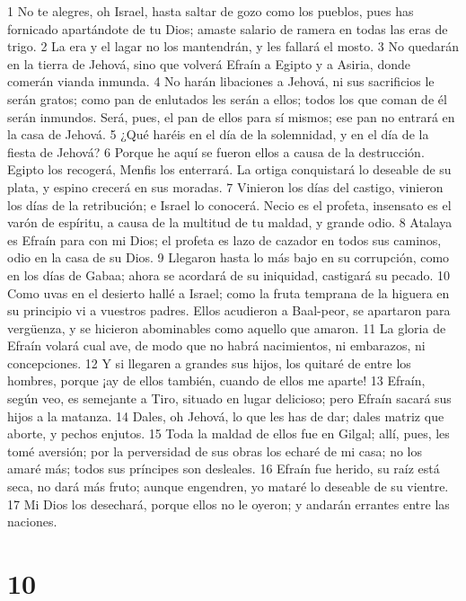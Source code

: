 1 No te alegres, oh Israel, hasta saltar de gozo como los pueblos, pues has fornicado apartándote de tu Dios; amaste salario de ramera en todas las eras de trigo.
2 La era y el lagar no los mantendrán, y les fallará el mosto.
3 No quedarán en la tierra de Jehová, sino que volverá Efraín a Egipto y a Asiria, donde comerán vianda inmunda.
4 No harán libaciones a Jehová, ni sus sacrificios le serán gratos; como pan de enlutados les serán a ellos; todos los que coman de él serán inmundos. Será, pues, el pan de ellos para sí mismos; ese pan no entrará en la casa de Jehová.
5 ¿Qué haréis en el día de la solemnidad, y en el día de la fiesta de Jehová?
6 Porque he aquí se fueron ellos a causa de la destrucción. Egipto los recogerá, Menfis los enterrará. La ortiga conquistará lo deseable de su plata, y espino crecerá en sus moradas.
7 Vinieron los días del castigo, vinieron los días de la retribución; e Israel lo conocerá. Necio es el profeta, insensato es el varón de espíritu, a causa de la multitud de tu maldad, y grande odio.
8 Atalaya es Efraín para con mi Dios; el profeta es lazo de cazador en todos sus caminos, odio en la casa de su Dios.
9 Llegaron hasta lo más bajo en su corrupción, como en los días de Gabaa; ahora se acordará de su iniquidad, castigará su pecado.
10 Como uvas en el desierto hallé a Israel; como la fruta temprana de la higuera en su principio vi a vuestros padres. Ellos acudieron a Baal-peor, se apartaron para vergüenza, y se hicieron abominables como aquello que amaron.
11 La gloria de Efraín volará cual ave, de modo que no habrá nacimientos, ni embarazos, ni concepciones.
12 Y si llegaren a grandes sus hijos, los quitaré de entre los hombres, porque ¡ay de ellos también, cuando de ellos me aparte!
13 Efraín, según veo, es semejante a Tiro, situado en lugar delicioso; pero Efraín sacará sus hijos a la matanza.
14 Dales, oh Jehová, lo que les has de dar; dales matriz que aborte, y pechos enjutos.
15 Toda la maldad de ellos fue en Gilgal; allí, pues, les tomé aversión; por la perversidad de sus obras los echaré de mi casa; no los amaré más; todos sus príncipes son desleales.
16 Efraín fue herido, su raíz está seca, no dará más fruto; aunque engendren, yo mataré lo deseable de su vientre.
17 Mi Dios los desechará, porque ellos no le oyeron; y andarán errantes entre las naciones.

\chapter{10}

